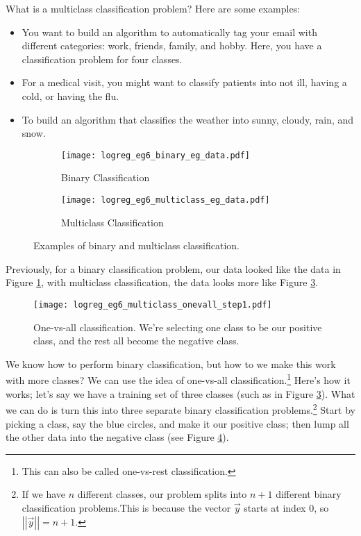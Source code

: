 What is a multiclass classification problem? Here are some examples:
\begin{itemize}
\item You want to build an algorithm to automatically tag your email with different categories: work, friends, family, and hobby. Here, you have a classification problem for four classes. 
\item For a medical visit, you might want to classify patients into not ill, having a cold, or having the flu. 
\item To build an algorithm that classifies the weather into sunny, cloudy, rain, and snow.
\end{itemize}
\begin{figure}[h]
	\centering
	\begin{subfigure}[t]{0.45\textwidth}
   		\centering
    		\graphicspath{{./Figures/}}
  		\texttt{[image: logreg\_eg6\_binary\_eg\_data.pdf]} 
   		\caption[]{Binary Classification}
   		\label{logreg_eg6_binary_eg_data.pdf}
	\end{subfigure}
	\begin{subfigure}[t]{0.45\textwidth}
   		\centering
    		\graphicspath{{./Figures/}}
   		\texttt{[image: logreg\_eg6\_multiclass\_eg\_data.pdf]} 
   		\caption[]{Multiclass Classification}
   		\label{logreg_eg6_multiclass_eg_data.pdf}
	\end{subfigure}
	\caption[]{Examples of binary and multiclass classification.}
\end{figure}
Previously, for a binary classification problem, our data looked like the data in Figure \ref{logreg_eg6_binary_eg_data.pdf}, with multiclass classification, the data looks more like Figure \ref{logreg_eg6_multiclass_eg_data.pdf}.
\begin{figure}[h] %
	\centering
	\graphicspath{{./Figures/}} %
	\texttt{[image: logreg\_eg6\_multiclass\_onevall\_step1.pdf]} 
	\caption[]{One-vs-all classification. We're selecting one class to be our positive class, and the rest all become the negative class.}
	\label{logreg_eg6_multiclass_onevall_step1.pdf}
\end{figure}

We know how to perform binary classification, but how to we make this work with more classes? We can use the idea of one-vs-all classification.\footnote{This can also be called one-vs-rest classification.} Here's how it works; let's say we have a training set of three classes (such as in Figure \ref{logreg_eg6_multiclass_eg_data.pdf}). What we can do is turn this into three separate binary classification problems.\footnote{If we have $n$ different classes, our problem splits into $n+1$ different binary classification problems.This is because the vector $\vec{y}$ starts at index $0$, so $\left|\left|\vec{y}\right|\right| = n+1$.} Start by picking a class, say the blue circles, and make it our positive class; then lump all the other data into the negative class (see Figure \ref{logreg_eg6_multiclass_onevall_step1.pdf}).

